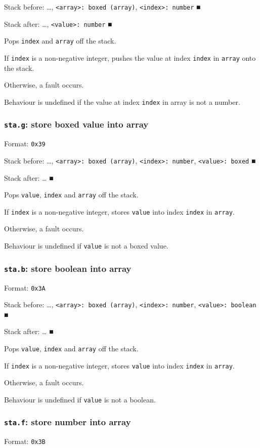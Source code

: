 Stack before: \ldots{}​, \texttt{<array>: boxed (array)}, \texttt{<index>: number} ■

Stack after: \ldots{}​, \texttt{<value>: number} ■

Pops \texttt{index} and \texttt{array} off the stack.

If \texttt{index} is a non-negative integer, pushes the value at index \texttt{index}
in \texttt{array} onto the stack.

Otherwise, a fault occurs.

Behaviour is undefined if the value at index \texttt{index} in array is not a
number.

\subsubsection{\texttt{sta.g}: store boxed value into array}
\label{sec:org4724d89}
Format: \texttt{0x39}

Stack before: \ldots{}​, \texttt{<array>: boxed (array)}, \texttt{<index>: number},
\texttt{<value>: boxed} ■

Stack after: \ldots{}​ ■

Pops \texttt{value}, \texttt{index} and \texttt{array} off the stack.

If \texttt{index} is a non-negative integer, stores \texttt{value} into index \texttt{index}
in \texttt{array}.

Otherwise, a fault occurs.

Behaviour is undefined if \texttt{value} is not a boxed value.

\subsubsection{\texttt{sta.b}: store boolean into array}
\label{sec:org8e9e3f6}
Format: \texttt{0x3A}

Stack before: \ldots{}​, \texttt{<array>: boxed (array)}, \texttt{<index>: number},
\texttt{<value>: boolean} ■

Stack after: \ldots{}​ ■

Pops \texttt{value}, \texttt{index} and \texttt{array} off the stack.

If \texttt{index} is a non-negative integer, stores \texttt{value} into index \texttt{index}
in \texttt{array}.

Otherwise, a fault occurs.

Behaviour is undefined if \texttt{value} is not a boolean.

\subsubsection{\texttt{sta.f}: store number into array}
\label{sec:org3dfaf54}
Format: \texttt{0x3B}

